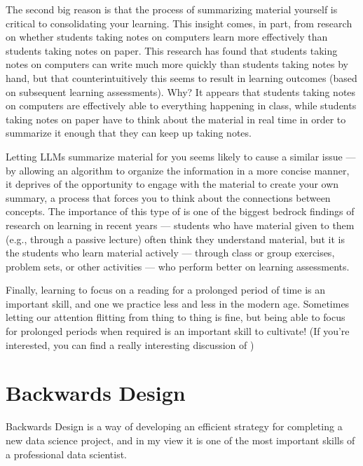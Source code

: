\documentclass[letterpaper,10pt,english]{jupyterBook}
\begin{document}
\sphinxAtStartPar
The second big reason is that the process of summarizing material yourself is critical to consolidating your learning. This insight comes, in part, from research on whether students taking notes on computers learn more effectively than students taking notes on paper. This research has found that students taking notes on computers can write much more quickly than students taking notes by hand, but that counter\sphinxhyphen{}intuitively this seems to result in  learning outcomes (based on subsequent learning assessments). Why? It appears that students taking notes on computers are effectively able to  everything happening in class, while students taking notes on paper have to think about the material in real time in order to summarize it enough that they can keep up taking notes.

\sphinxAtStartPar
Letting LLMs summarize material for you seems likely to cause a similar issue — by allowing an algorithm to organize the information in a more concise manner, it deprives  of the opportunity to engage with the material to create your own summary, a process that forces you to  think about the connections between concepts. The importance of this type of  is one of the biggest bedrock findings of research on learning in recent years — students who have material given to them (e.g., through a passive lecture) often think they understand material, but it is the students who learn material actively — through class or group exercises, problem sets, or other activities — who perform better on learning assessments.

\sphinxAtStartPar
Finally, learning to focus on a reading for a prolonged period of time is an important skill, and one we practice less and less in the modern age. Sometimes letting our attention flitting from thing to thing is fine, but being able to focus for prolonged periods when required is an important skill to cultivate! (If you’re interested, you can find a really interesting discussion of )

\sphinxstepscope


\chapter{Backwards Design}
\label{\detokenize{40_in_practice/05_backwards_design:backwards-design}}\label{\detokenize{40_in_practice/05_backwards_design::doc}}
\sphinxAtStartPar
Backwards Design is a way of developing an efficient strategy for completing a new data science project, and in my view it is one of the most important skills of a professional data scientist.
\end{document}
